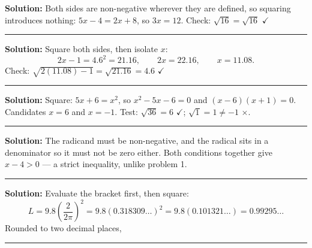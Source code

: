\documentclass[12pt]{article}
\begin{document}

\textbf{Solution:} Both sides are non-negative wherever they are defined, so
squaring introduces nothing: $5x - 4 = 2x + 8$, so $3x = 12$. Check:
$\sqrt{16} = \sqrt{16}$ $\checkmark$ 

\vspace{0.2cm}\noindent\rule{\linewidth}{0.2pt}\vspace{0.2cm}


\textbf{Solution:} Square both sides, then isolate $x$:
\[ 2x - 1 = 4.6^2 = 21.16 , \qquad 2x = 22.16 , \qquad x = 11.08 . \]
Check: $\sqrt{2(11.08)-1} = \sqrt{21.16} = 4.6$ $\checkmark$ 

\vspace{0.2cm}\noindent\rule{\linewidth}{0.2pt}\vspace{0.2cm}


\textbf{Solution:} Square: $5x + 6 = x^2$, so $x^2 - 5x - 6 = 0$ and
$(x-6)(x+1) = 0$. Candidates $x = 6$ and $x = -1$. Test:
$\sqrt{36} = 6$ $\checkmark$; $\sqrt{1} = 1 \ne -1$ $\times$. 

\vspace{0.2cm}\noindent\rule{\linewidth}{0.2pt}\vspace{0.2cm}


\textbf{Solution:} The radicand must be non-negative, and the radical sits in a
denominator so it must not be zero either. Both conditions together give
$x - 4 > 0$ --- a strict inequality, unlike problem 1. 

\vspace{0.2cm}\noindent\rule{\linewidth}{0.2pt}\vspace{0.2cm}


\textbf{Solution:} Evaluate the bracket first, then square:
\[ L = 9.8\left(\frac{2}{2\pi}\right)^2 = 9.8(0.318309\ldots)^2
     = 9.8(0.101321\ldots) = 0.99295\ldots \]
Rounded to two decimal places, 

\vspace{0.2cm}\noindent\rule{\linewidth}{0.2pt}\vspace{0.2cm}
\end{document}
